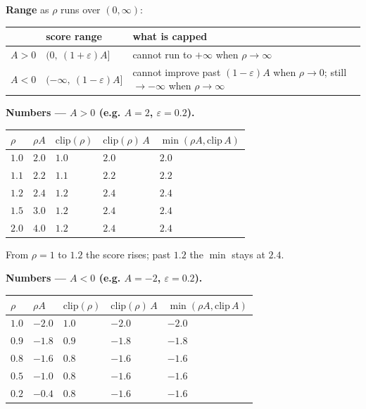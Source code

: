 \textbf{Range} as $\rho$ runs over $(0,\infty)$:

\begin{center}
\begin{tabular}{lll}
\toprule
 & score range & what is capped \\
\midrule
$A>0$ & $(0,\ (1+\varepsilon)A]$ & cannot run to $+\infty$ when $\rho\to\infty$ \\
$A<0$ & $(-\infty,\ (1-\varepsilon)A]$ & cannot improve past $(1-\varepsilon)A$ when $\rho\to 0$; still $\to-\infty$ when $\rho\to\infty$ \\
\bottomrule
\end{tabular}
\end{center}

\textbf{Numbers --- $A>0$ (e.g. $A=2$, $\varepsilon=0.2$).}

\begin{center}
\begin{tabular}{lllll}
\toprule
$\rho$ & $\rho A$ & $\mathrm{clip}(\rho)$ & $\mathrm{clip}(\rho)\,A$ & $\min(\rho A,\mathrm{clip}\,A)$ \\
\midrule
$1.0$ & $2.0$ & $1.0$ & $2.0$ & $2.0$ \\
$1.1$ & $2.2$ & $1.1$ & $2.2$ & $2.2$ \\
$1.2$ & $2.4$ & $1.2$ & $2.4$ & $2.4$ \\
$1.5$ & $3.0$ & $1.2$ & $2.4$ & $2.4$ \\
$2.0$ & $4.0$ & $1.2$ & $2.4$ & $2.4$ \\
\bottomrule
\end{tabular}
\end{center}

From $\rho=1$ to $1.2$ the score rises; past $1.2$ the $\min$ stays at $2.4$.

\textbf{Numbers --- $A<0$ (e.g. $A=-2$, $\varepsilon=0.2$).}

\begin{center}
\begin{tabular}{lllll}
\toprule
$\rho$ & $\rho A$ & $\mathrm{clip}(\rho)$ & $\mathrm{clip}(\rho)\,A$ & $\min(\rho A,\mathrm{clip}\,A)$ \\
\midrule
$1.0$ & $-2.0$ & $1.0$ & $-2.0$ & $-2.0$ \\
$0.9$ & $-1.8$ & $0.9$ & $-1.8$ & $-1.8$ \\
$0.8$ & $-1.6$ & $0.8$ & $-1.6$ & $-1.6$ \\
$0.5$ & $-1.0$ & $0.8$ & $-1.6$ & $-1.6$ \\
$0.2$ & $-0.4$ & $0.8$ & $-1.6$ & $-1.6$ \\
\bottomrule
\end{tabular}
\end{center}

